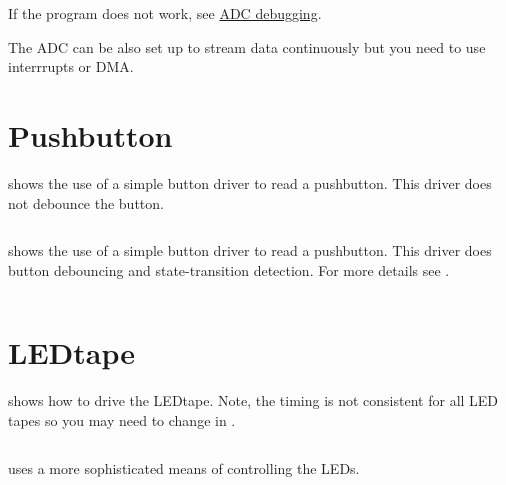 If the program does not work, see  \hyperref[debugging-adc]{ADC debugging}.

The ADC can be also set up to stream data continuously but you need to
use interrrupts or DMA.


\section{Pushbutton}
\label{pushbutton}

 shows the use of a
simple button driver to read a pushbutton.  This driver does not debounce the button.

\inputminted{C}{../../src/test-apps/button_test1/button_test1.c}

 shows the use of a
simple button driver to read a pushbutton.  This driver does button
debouncing and state-transition detection.  For more details see
.

\inputminted{C}{../../src/test-apps/button_test2/button_test2.c}


\section{LEDtape}
\label{ledtape}

 shows how to drive the
LEDtape.  Note, the timing is not consistent for all LED tapes so you
may need to change  in .

\inputminted{C}{../../src/test-apps/ledtape_test1/ledtape_test1.c}


 uses a more
sophisticated means of controlling the LEDs.

\inputminted{C}{../../src/test-apps/ledtape_test2/ledtape_test2.c}
